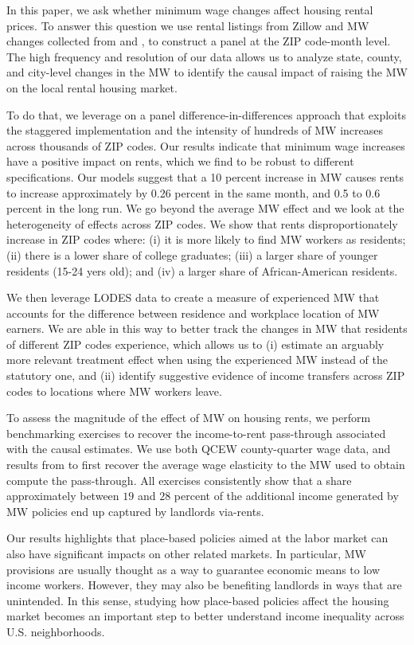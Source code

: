 
In this paper, we ask whether minimum wage changes affect housing rental prices. To answer this 
question we use rental listings from Zillow and MW changes collected from 
\textcite{VaghulZipperer2016} and \textcite{BerkeleyLaborCenter}, to construct a panel 
at the ZIP code-month level. The high frequency and resolution of our data allows us to analyze state, 
county, and city-level changes in the MW to identify the causal impact of raising the MW on the 
local rental housing market. 

To do that, we leverage on a panel difference-in-differences approach that 
exploits the staggered implementation and the intensity of hundreds of MW increases 
across thousands of ZIP codes. Our results indicate that minimum wage increases have a
positive impact on rents, which we find to be robust to different specifications. Our models
suggest that a 10 percent increase in MW causes rents to increase approximately by 
0.26 percent in the same month, and 0.5 to 0.6 percent in the long run. We go beyond the average 
MW effect and we look at the heterogeneity of effects across ZIP codes. 
We show that rents disproportionately increase in ZIP codes where: (i) it is more likely to find 
MW workers as residents; (ii) there is a lower share of college graduates;  (iii) a larger share 
of younger residents (15-24 yers old);  and (iv) a larger share of African-American residents. 

We then leverage LODES data to create a measure of experienced MW that accounts for the difference 
between residence and workplace location of MW earners. We are able in this way to better track the 
changes in MW that residents of different ZIP codes experience, which allows us to (i) estimate an 
arguably more relevant treatment effect when using the experienced MW instead of the statutory one,
and (ii) identify suggestive evidence of income transfers across ZIP codes to locations where MW
workers leave.

To assess the magnitude of the effect of MW on housing rents, we perform 
benchmarking exercises to recover the income-to-rent pass-through associated with the causal estimates. 
We use both QCEW county-quarter wage data, and results from \textcite{CegnizEtAl2019} to first 
recover the average wage elasticity to the MW used to obtain compute the pass-through. All exercises 
consistently show that a share approximately between $19$ and $28$ percent of the additional income 
generated by MW policies end up captured by landlords via-rents.

Our results highlights that place-based policies aimed at the labor market can also have 
significant impacts on other related markets. In particular, MW provisions are usually thought as a 
way to guarantee economic means to low income workers. However, they may also be benefiting 
landlords in ways that are unintended. In this sense, studying how place-based policies affect the 
housing market becomes an important step to better understand income inequality across U.S. 
neighborhoods.
